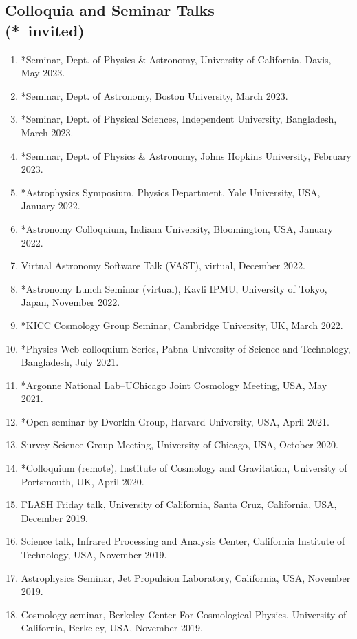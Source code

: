 \documentclass[margin, line]{res}
\begin{document}
\begin{resume}
\section{\sc Colloquia and Seminar Talks\\ ({*}\ invited)}
\begin{enumerate}
	\item *Seminar, Dept. of Physics \& Astronomy, University of California, Davis, May 2023.
	\item *Seminar, Dept. of Astronomy, Boston University, March 2023.
	\item *Seminar, Dept. of Physical Sciences, Independent University, Bangladesh, March 2023.
	\item {*}Seminar, Dept. of Physics \& Astronomy, Johns Hopkins University, February 2023.
	\item {*}Astrophysics Symposium, Physics Department, Yale University, USA, January 2022.
	\item {*}Astronomy Colloquium, Indiana University, Bloomington, USA, January 2022.
	\item Virtual Astronomy Software Talk (VAST), virtual, December 2022.
	\item {*}Astronomy Lunch Seminar (virtual), Kavli IPMU, University of Tokyo, Japan, November 2022.
	\item {*}KICC Cosmology Group Seminar, Cambridge University, UK, March 2022.
	\item {*}Physics Web-colloquium Series, Pabna University of Science and Technology, Bangladesh, July 2021.
	\item {*}Argonne National Lab--UChicago Joint Cosmology Meeting, USA, May 2021.
	\item {*}Open seminar by Dvorkin Group, Harvard University, USA, April 2021.
	\item Survey Science Group Meeting, University of Chicago, USA, October 2020.
	\item {*}Colloquium (remote), Institute of Cosmology and Gravitation, University of Portsmouth, UK, April 2020.
	\item FLASH Friday talk, University of California, Santa Cruz, California, USA, December 2019.
	\item Science talk, Infrared Processing and Analysis Center, California Institute of Technology, USA, November 2019.
	\item Astrophysics Seminar, Jet Propulsion Laboratory, California, USA, November 2019.
	\item Cosmology seminar, Berkeley Center For Cosmological Physics, University of California, Berkeley, USA, November 2019. 

\end{enumerate}
\end{resume}
\end{document}
